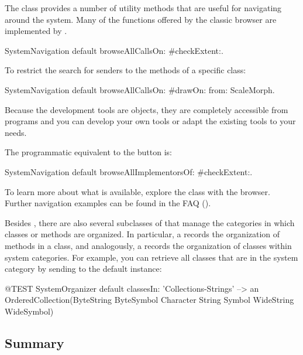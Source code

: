 \documentclass[a4paper,10pt,twoside]{book}
\begin{document}
The class  provides a number of utility methods that are useful for navigating around the system.
Many of the functions offered by the classic browser are implemented by .

\begin{code}{}
SystemNavigation default browseAllCallsOn: #checkExtent:.
\end{code}
To restrict the search for senders to the methods of a specific class:
\begin{code}{}
SystemNavigation default browseAllCallsOn: #drawOn: from: ScaleMorph.
\end{code}
Because the development tools are objects, they are completely accessible from programs and you can develop your own tools or adapt the existing tools to your needs.

The programmatic equivalent to the  button is:
\begin{code}{}
SystemNavigation default browseAllImplementorsOf: #checkExtent:.
\end{code}

To learn more about what is available, explore the class  with the browser.
Further navigation examples can be found in the FAQ ().

Besides , there are also several subclasses of  that manage the categories in which classes or methods are organized.
In particular, a  records the organization of methods in a class, and analogously, a  records the organization of classes within system categories.
For example, you can retrieve all classes that are in the system category  by sending  to the default  instance:
\begin{code}{@TEST}
SystemOrganizer default classesIn: 'Collections-Strings' --> an OrderedCollection(ByteString ByteSymbol Character String Symbol WideString WideSymbol)
\end{code}


\subsection{Summary}
\end{document}
